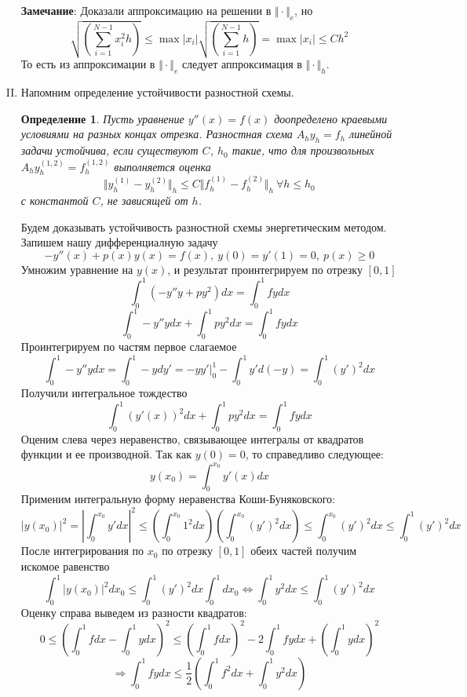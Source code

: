 \documentclass[12pt]{article}
\newtheorem*{definition}{Определение}
\begin{document}
\begin{enumerate}[I.]
	      \textbf{Замечание}: Доказали аппроксимацию на решении в $\Vert\cdot\Vert_e$, но
	      \[\sqrt{\left(\sum_{i=1}^{N-1}x_i^2h\right)}\leq\max|x_i|\sqrt{\left(\sum_{i=1}^{N-1}h\right)}=\max|x_i|\leq C h^2\]
	      То есть из аппроксимации в $\Vert\cdot\Vert_e$ следует аппроксимация в $\Vert\cdot\Vert_h$.

	      \newpage

	\item Напомним определение устойчивости разностной схемы.
	      \begin{definition}
		      Пусть уравнение $y''(x)=f(x)$ доопределено краевыми
		      условиями на разных концах отрезка. Разностная схема
		      $A_hy_h = f_h$ линейной задачи устойчива, если существуют $C$, $h_0$ такие, что для
		      произвольных $A_hy^{(1,2)}_h = f^{(1,2)}_h$ выполняется оценка
		      \[\Vert y^{(1)}_h-y^{(2)}_h\Vert_h\leq C\Vert f^{(1)}_h -f^{(2)}_h\Vert_h\ \forall h\leq h_0\]
		      с константой $C$, не зависящей от $h$.
	      \end{definition}

	      Будем доказывать устойчивость разностной схемы энергетическим методом.
	      Запишем нашу дифференциалную задачу
	      \[-y''(x)+p(x)y(x)=f(x),\ y(0) = y'(1) = 0,\ p(x)\geq 0\]
	      Умножим уравнение на $y(x)$, и результат проинтегрируем по отрезку $[0, 1]$
	      \[\int_0^1 (-y''y+py^2)dx = \int_0^1fydx \]
	      \[\int_0^1 -y''ydx+ \int_0^1py^2 dx = \int_0^1fydx \]
	      Проинтегрируем по частям первое слагаемое
	      \[\int_0^1 -y''ydx = \int_0^1-ydy' = -yy'\vert^1_0 - \int_0^1y'd(-y) = \int_0^1(y')^2dx\]
	      Получили интегральное тождество
	      \[\int_0^1 (y'(x))^2dx+ \int_0^1py^2 dx = \int_0^1fydx \]
	      Оценим слева через неравенство, связывающее интегралы от квадратов
	      функции и ее производной. Так как $y(0) = 0$, то справедливо следующее:
	      \[y(x_0) = \int_0^{x_0}y'(x)dx\]
	      Применим интегральную форму неравенства Коши-Буняковского:
	      \[|y(x_0)|^2 = \left|\int_0^{x_0}y'dx\right|^2\leq\left(\int_0^{x_0}1^2dx\right)\left(\int_0^{x_0}(y')^2dx\right)\leq\int_0^{x_0}(y')^2dx\leq\int_0^{1}(y')^2dx\]
	      После интегрирования по $x_0$ по отрезку $[0,1]$ обеих частей получим искомое равенство
	      \[\int_0^1|y(x_0)|^2dx_0 \leq \int_0^{1}(y')^2dx\int_0^1dx_0 \Leftrightarrow \int_0^1y^2dx\leq\int_0^1(y')^2dx\]
	      Оценку справа выведем из разности квадратов:
	      \[0\leq\left(\int_0^1fdx-\int_0^1ydx\right)^2\leq\left(\int_0^1fdx\right)^2-2\int_0^1fydx+\left(\int_0^1ydx\right)^2\]
	      \[\Rightarrow\int_0^1fydx\leq\frac{1}{2}\left(\int_0^1f^2dx + \int_0^1y^2dx\right)\]


\end{enumerate}
\end{document}
